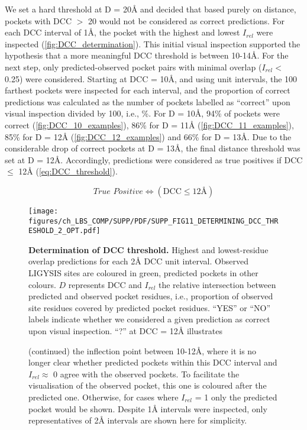 We set a hard threshold at D = 20\AA{} and decided that based purely on distance, pockets with DCC $>$ 20 would not be considered as correct predictions. For each DCC interval of 1\AA{}, the pocket with the highest and lowest $I_{rel}$ were inspected (\autoref{fig:DCC_determination}). This initial visual inspection supported the hypothesis that a more meaningful DCC threshold is between 10-14\AA{}. For the next step, only predicted-observed pocket pairs with minimal overlap ($I_{rel} <$ 0.25) were considered. Starting at DCC = 10\AA{}, and using unit intervals, the 100 farthest pockets were inspected for each interval, and the proportion of correct predictions was calculated as the number of pockets labelled as ``correct'' upon visual inspection divided by 100, i.e., \%. For D = 10\AA{}, 94\% of pockets were correct (\autoref{fig:DCC_10_examples}), 86\% for D = 11\AA{} (\autoref{fig:DCC_11_examples}), 85\% for D = 12\AA{} (\autoref{fig:DCC_12_examples}) and 66\% for D = 13\AA{}. Due to the considerable drop of correct pockets at D = 13\AA{}, the final distance threshold was set at D = 12\AA{}. Accordingly, predictions were considered as true positives if DCC $\leq$ 12\AA{} (\autoref{eq:DCC_threshold}).

\begin{equation}
\textit{True Positive} \iff (\text{DCC} \leq 12\text{\AA{}})
\label{eq:DCC_threshold}
\end{equation}

\begin{figure}
    \centering
    \texttt{[image: figures/ch\_LBS\_COMP/SUPP/PDF/SUPP\_FIG11\_DETERMINING\_DCC\_THRESHOLD\_2\_OPT.pdf]}
    
    \caption[Determination of DCC threshold]{\textbf{Determination of DCC threshold.} Highest and lowest-residue overlap predictions for each 2\AA{} DCC unit interval. Observed LIGYSIS sites are coloured in green, predicted pockets in other colours. $D$ represents DCC and $I_{rel}$ the relative intersection between predicted and observed pocket residues, i.e., proportion of observed site residues covered by predicted pocket residues. ``YES'' or ``NO'' labels indicate whether we considered a given prediction as correct upon visual inspection. ``?'' at DCC = 12\AA{} illustrates    }
    \label{fig:DCC_determination}
\end{figure}

\begin{figure}[ht]
\ContinuedFloat
\caption*{(continued) the inflection point between 10-12\AA{}, where it is no longer clear whether predicted pockets within this DCC interval and $I_{rel} \approx$ 0 agree with the observed pockets. To facilitate the visualisation of the observed pocket, this one is coloured after the predicted one. Otherwise, for cases where $I_{rel}$ = 1 only the predicted pocket would be shown. Despite 1\AA{} intervals were inspected, only representatives of 2\AA{} intervals are shown here for simplicity.}
\end{figure}
\FloatBarrier

